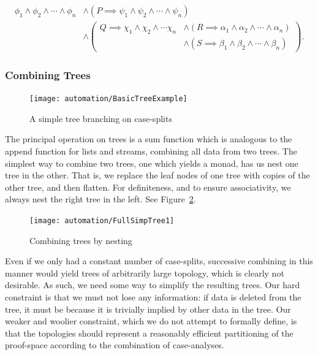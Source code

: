 \begin{equation}\label{eq:CaseAnalysisTreeFormula}
\begin{aligned}
\phi_1 \wedge \phi_2 \wedge \cdots \wedge \phi_n &\wedge (P \implies \psi_1 \wedge \psi_2 \wedge \cdots \wedge \psi_n)\\
&\wedge \left(\begin{aligned} Q \implies \chi_1 \wedge \chi_2 \wedge \cdots \chi_n &\wedge (R \implies \alpha_1 \wedge \alpha_2 \wedge \cdots \wedge \alpha_n)\\ &\wedge (S \implies \beta_1 \wedge \beta_2 \wedge \cdots \wedge \beta_n)\end{aligned}\right).
\end{aligned}
\end{equation}

\subsubsection{Combining Trees}\label{fig:CombiningTrees}
\begin{figure}
\centering\texttt{[image: automation/BasicTreeExample]}
\caption{A simple tree branching on case-splits}
\label{fig:BasicTreeExample}
\end{figure}

The principal operation on trees is a sum function which is analogous to the append function for lists and streams, combining all data from two trees. The simplest way to combine two trees, one which yields a monad, has us nest one tree in the other. That is, we replace the leaf nodes of one tree with copies of the other tree, and then flatten. For definiteness, and to ensure associativity, we always nest the right tree in the left. See Figure~\ref{fig:TreeNesting}.

\begin{figure}
\centering\texttt{[image: automation/FullSimpTree1]}
\caption{Combining trees by nesting}
\label{fig:TreeNesting}
\end{figure}

Even if we only had a constant number of case-splits, successive combining in this manner would yield trees of arbitrarily large topology, which is clearly not desirable. As such, we need some way to simplify the resulting trees. Our hard constraint is that we must not lose any information: if data is deleted from the tree, it must be because it is trivially implied by other data in the tree. Our weaker and woolier constraint, which we do not attempt to formally define, is that the topologies should represent a reasonably efficient partitioning of the proof-space according to the combination of case-analyses.

